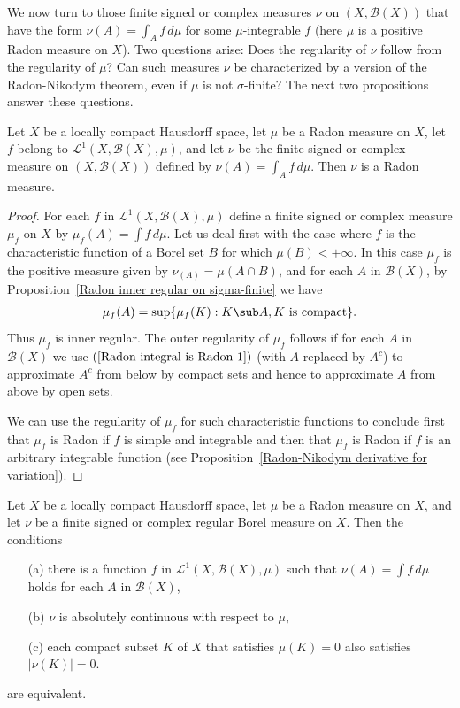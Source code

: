 We now turn to those finite signed or complex measures $\nu$ on $(X,\mathcal{B}(X))$ that have the form $\nu(A)=\int_Af\,d\mu$ for some $\mu$-integrable $f$ (here $\mu$ is a positive Radon measure on $X$). Two questions arise: Does the regularity of $\nu$ follow from the regularity of $\mu$? Can such measures $\nu$ be characterized by a version of the Radon-Nikodym theorem, even if $\mu$ is not $\sigma$-finite? The next two propositions answer these questions.
\begin{proposition}\label{Radon integral is Radon}
Let $X$ be a locally compact Hausdorff space, let $\mu$ be a Radon measure on $X$, let $f$ belong to $\mathcal{L}^1(X,\mathcal{B}(X),\mu)$, and let $\nu$ be the finite signed or complex measure on $(X,\mathcal{B}(X))$ defined by $\nu(A)=\int_A f\,d\mu$. Then $\nu$ is a Radon measure.
\end{proposition}
\begin{proof}
For each $f$ in $\mathcal{L}^1(X,\mathcal{B}(X),\mu)$ define a finite signed or complex measure $\mu_f$ on $X$ by $\mu_f(A)=\int f\,d\mu$. Let us deal first with the case where $f$ is the characteristic function of a Borel set $B$ for which $\mu(B)<+\infty$. In this case $\mu_f$ is the positive measure given by $\nu_(A)=\mu(A\cap B)$, and for each $A$ in $\mathcal{B}(X)$, by Proposition~\ref{Radon inner regular on sigma-finite} we have
\begin{align}\label{Radon integral is Radon-1}
\mu_f(A)=\sup\{\mu_f(K):K\sub A,\text{$K$ is compact}\}.
\end{align}
Thus $\mu_f$ is inner regular. The outer regularity of $\mu_f$ follows if for each $A$ in $\mathcal{B}(X)$ we use $(\ref{Radon integral is Radon-1})$ (with $A$ replaced by $A^c$) to approximate $A^c$ from below by compact sets and hence to approximate $A$ from above by open sets.\par
We can use the regularity of $\mu_f$ for such characteristic functions to conclude first that $\mu_f$ is Radon if $f$ is simple and integrable and then that $\mu_f$ is Radon if $f$ is an arbitrary integrable function (see Proposition~\ref{Radon-Nikodym derivative for variation}).
\end{proof}
\begin{proposition}\label{Radon measure Radon-Nikodym}
Let $X$ be a locally compact Hausdorff space, let $\mu$ be a Radon measure on $X$, and let $\nu$ be a finite signed or complex regular Borel measure on $X$. Then the conditions
\begin{itemize}
\item[(a)] there is a function $f$ in $\mathcal{L}^1(X,\mathcal{B}(X),\mu)$ such that $\nu(A)=\int f\,d\mu$ holds for each $A$ in $\mathcal{B}(X)$,
\item[(b)] $\nu$ is absolutely continuous with respect to $\mu$,
\item[(c)] each compact subset $K$ of $X$ that satisfies $\mu(K)=0$ also satisfies $|\nu(K)|=0$.
\end{itemize}
are equivalent.
\end{proposition}
